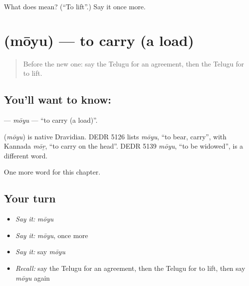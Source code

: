 \begin{tcolorbox}[breakable,colback=teal!4,colframe=teal!35!black,title={Before you move on}]
What does  mean? (\textquotedblleft{}To lift\textquotedblright{}.) Say it once more.
\end{tcolorbox}
\section[\texorpdfstring{\te{మోయు} (mōyu)}{మోయు (mōyu)}]{ (mōyu) — to carry (a load)}

\label{lesson:TE-C240-moyu}



\begin{quote}
Before the new one: say the Telugu for an agreement, then the Telugu for to lift.
\end{quote}

\subsection*{You'll want to know: }
\textbf{} — \emph{mōyu} — \textquotedblleft{}to carry (a load)\textquotedblright{}.

\begin{cousinweb}
\textbf{} (\emph{mōyu}) is native Dravidian. DEDR 5126 lists \emph{mōyu}, \textquotedblleft{}to bear, carry\textquotedblright{}, with Kannada \emph{mōṟ}, \textquotedblleft{}to carry on the head\textquotedblright{}. DEDR 5139 \emph{mōyu}, \textquotedblleft{}to be widowed\textquotedblright{}, is a different word.
\end{cousinweb}

\begin{grammarlens}[title={What you've built}]
One more word for this chapter.
\end{grammarlens}

\subsection*{Your turn}
\begin{itemize}
\raggedright
  \item \emph{Say it:} \emph{mōyu}
  \item \emph{Say it:} \emph{mōyu}, once more
  \item \emph{Say it:} say \emph{mōyu}
  \item \emph{Recall:} say the Telugu for an agreement, then the Telugu for to lift, then say \emph{mōyu} again
\end{itemize}

